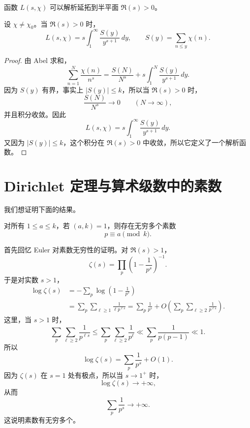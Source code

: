 \begin{exercise}
	函数 $L(s,\chi)$ 可以解析延拓到半平面 $\Re(s)>0$。
\end{exercise}

\begin{lemma}
	设 $\chi\neq\chi_0$。当 $\Re(s)>0$ 时，
	\[
		L(s,\chi)
		=
		s\int_1^\infty \frac{S(y)}{y^{s+1}}\,dy,
		\qquad
		S(y)=\sum_{n\leq y}\chi(n).
	\]
\end{lemma}

\begin{proof}
	由 Abel 求和，
	\[
		\sum_{n=1}^N\frac{\chi(n)}{n^s}
		=
		\frac{S(N)}{N^s}
		+
		s\int_1^N\frac{S(y)}{y^{s+1}}\,dy.
	\]
	因为 $S(y)$ 有界，事实上 $|S(y)|\leq k$，所以当 $\Re(s)>0$ 时，
	\[
		\frac{S(N)}{N^s}\longrightarrow 0
		\qquad (N\to\infty),
	\]
	并且积分收敛。因此
	\[
		L(s,\chi)
		=
		s\int_1^\infty\frac{S(y)}{y^{s+1}}\,dy.
	\]
	又因为 $|S(y)|\leq k$，这个积分在 $\Re(s)>0$ 中收敛，所以它定义了一个解析函数。
\end{proof}

\chapter{Dirichlet 定理与算术级数中的素数}
\label{chap:dirichlet-theorem-arithmetic-progressions}

我们想证明下面的结果。

\begin{theorem}[Dirichlet]
	对所有 $1\leq a\leq k$，若 $(a,k)=1$，则存在无穷多个素数
	\[
		p\equiv a\pmod k.
	\]
\end{theorem}

首先回忆 Euler 对素数无穷性的证明。对 $\Re(s)>1$，
\[
	\zeta(s)=\prod_p\left(1-\frac{1}{p^s}\right)^{-1}.
\]
于是对实数 $s>1$，
\[
\begin{aligned}
	\log\zeta(s)
	&=
	-\sum_p\log\left(1-\frac{1}{p^s}\right)  \\
	&=
	\sum_p\sum_{\ell\geq 1}\frac{1}{\ell p^{\ell s}}
	=
	\sum_p\frac{1}{p^s}
	+
	O\left(\sum_p\sum_{\ell\geq 2}\frac{1}{p^{\ell s}}\right).
\end{aligned}
\]
这里，当 $s>1$ 时，
\[
	\sum_p\sum_{\ell\geq 2}\frac{1}{p^{\ell s}}
	\leq
	\sum_p\sum_{\ell\geq 2}\frac{1}{p^\ell}
	\ll
	\sum_p\frac{1}{p(p-1)}
	\ll 1.
\]
所以
\[
	\log\zeta(s)=\sum_p\frac{1}{p^s}+O(1).
\]
因为 $\zeta(s)$ 在 $s=1$ 处有极点，所以当 $s\to 1^+$ 时，
\[
	\log\zeta(s)\to +\infty,
\]
从而
\[
	\sum_p\frac{1}{p^s}\to+\infty.
\]
这说明素数有无穷多个。

